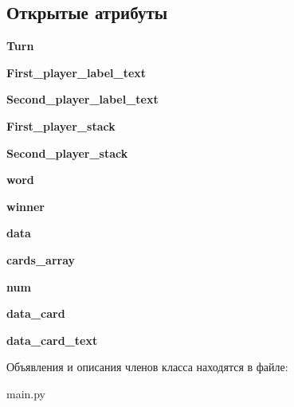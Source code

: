 \subsection*{Открытые атрибуты}
\begin{DoxyCompactItemize}
\item 
\mbox{\label{classmain_1_1_play___window_addda02907958a97f0fc9d0243858b286}} 
{\bfseries Turn}
\item 
\mbox{\label{classmain_1_1_play___window_a2f848043f7388152c6340a6665cdcaea}} 
{\bfseries First\+\_\+player\+\_\+label\+\_\+text}
\item 
\mbox{\label{classmain_1_1_play___window_ad188f8db4593aaaeb5aec03229314a55}} 
{\bfseries Second\+\_\+player\+\_\+label\+\_\+text}
\item 
\mbox{\label{classmain_1_1_play___window_aa4864362d632a424cbf2e5f6b811ad74}} 
{\bfseries First\+\_\+player\+\_\+stack}
\item 
\mbox{\label{classmain_1_1_play___window_a4c9ed64e88d33c53857a063b0e222f63}} 
{\bfseries Second\+\_\+player\+\_\+stack}
\item 
\mbox{\label{classmain_1_1_play___window_a3ee1ef30c04c27861598f8efbef58537}} 
{\bfseries word}
\item 
\mbox{\label{classmain_1_1_play___window_a8f7a691e9e97b6d6f7bbf963f0bfa2cc}} 
{\bfseries winner}
\item 
\mbox{\label{classmain_1_1_play___window_aa057557e59c6257ec3115e9c2696f955}} 
{\bfseries data}
\item 
\mbox{\label{classmain_1_1_play___window_a7f12a12e4a5e053191e7b5988e53c532}} 
{\bfseries cards\+\_\+array}
\item 
\mbox{\label{classmain_1_1_play___window_a0362dcc3c10a3127709efc5a6d34a0ca}} 
{\bfseries num}
\item 
\mbox{\label{classmain_1_1_play___window_a2ea7f2e7ea96a958357d39b6307cae3b}} 
{\bfseries data\+\_\+card}
\item 
\mbox{\label{classmain_1_1_play___window_ad45b4e2c3342494e7e8875a2cd5664a7}} 
{\bfseries data\+\_\+card\+\_\+text}
\end{DoxyCompactItemize}


Объявления и описания членов класса находятся в файле\+:\begin{DoxyCompactItemize}
\item 
main.\+py\end{DoxyCompactItemize}
